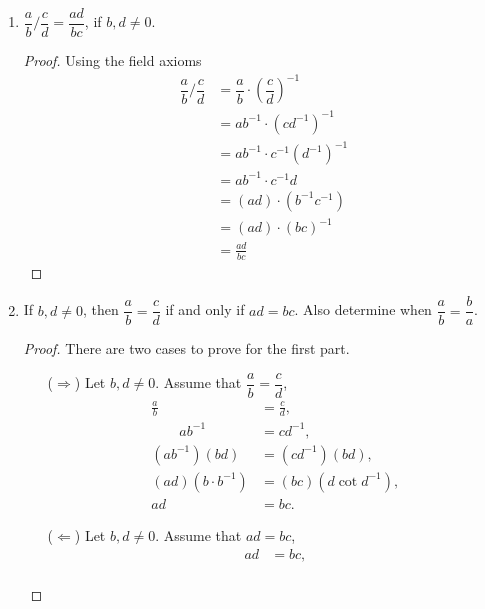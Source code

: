 \begin{exercise}[\textbf{3}]
\begin{enumerate}
\begin{proof}
\begin{align*}
                  &= (ac)\cdot (db)^{-1} \\
                  &= \dfrac{ac}{db}
              \end{align*}
         \end{proof}
         \item $\dfrac{a}{b} \bigg/ \dfrac{c}{d} = \dfrac{ad}{bc}$, if $b,d\neq 0$.
         \begin{proof} Using the field axioms
              \begin{align*}
                \dfrac{a}{b} \bigg/ \dfrac{c}{d} &= \dfrac{a}{b}\cdot\left(\dfrac{c}{d}\right)^{-1} \\
                &= ab^{-1}\cdot (cd^{-1})^{-1} \\
                &= ab^{-1} \cdot c^{-1}(d^{-1})^{-1} \\
                &= ab^{-1}\cdot c^{-1}d \\
                &= (ad)\cdot (b^{-1}c^{-1}) \\
                &= (ad)\cdot (bc)^{-1} \\
                &= \frac{ad}{bc}
              \end{align*}
         \end{proof}
         \pagebreak
         \item If $b,d \neq 0$, then $\dfrac{a}{b} = \dfrac{c}{d}$ if and only if
         $ad=bc$. Also determine when $\dfrac{a}{b} = \dfrac{b}{a}$.
         \begin{proof} There are two cases to prove for the first part. 
             \begin{itemize}
                 \item[($\Rightarrow$)] Let $b,d \neq 0$. Assume that
                 $\dfrac{a}{b} = \dfrac{c}{d}$,
                 \begin{align*}
                     \frac{a}{b} &= \frac{c}{d}, \\
                     \qquad ab^{-1} &= cd^{-1 }, \\
                     (ab^{-1})(bd) &= (cd^{-1})(bd), \\
                     (ad)(b\cdot b^{-1}) &= (bc)(d\cot d^{-1}), \\
                     ad &= bc.
                 \end{align*}
                 \item[($\Leftarrow$)] Let $b,d \neq 0$. Assume that $ad=bc$,
                 \begin{align*}
                     ad &= bc, \\

\end{align*}
\end{itemize}
\end{proof}
\end{enumerate}
\end{exercise}

